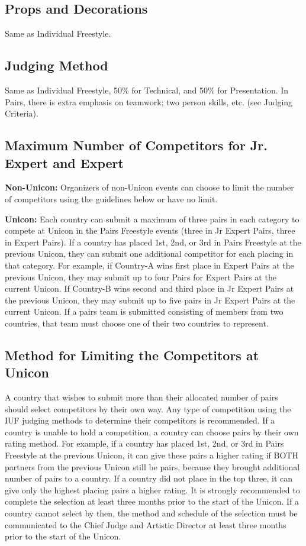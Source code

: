 \subsection{Props and Decorations}
Same as Individual Freestyle.

\subsection{Judging Method}
Same as Individual Freestyle, 50\% for Technical, and 50\% for Presentation.
In Pairs, there is extra emphasis on teamwork; two person skills, etc.
(see Judging Criteria).

\subsection{Maximum Number of Competitors for Jr. Expert and Expert}
\textbf{Non-Unicon:} Organizers of non-Unicon events can choose to limit the number of competitors using the guidelines below or have no limit.

\textbf{Unicon:} Each country can submit a maximum of three pairs in each category to compete at Unicon in the Pairs Freestyle events (three in Jr Expert Pairs, three in Expert Pairs).
If a country has placed 1st, 2nd, or 3rd in Pairs Freestyle at the previous Unicon, they can submit one additional competitor for each placing in that category.
For example, if Country-A wins first place in Expert Pairs at the previous Unicon, they may submit up to four Pairs for Expert Pairs at the current Unicon.
If Country-B wins second and third place in Jr Expert Pairs at the previous Unicon, they may submit up to five pairs in Jr Expert Pairs at the current Unicon.
If a pairs team is submitted consisting of members from two countries, that team must choose one of their two countries to represent.

\subsection{Method for Limiting the Competitors at Unicon}
A country that wishes to submit more than their allocated number of pairs should select competitors by their own way.
Any type of competition using the IUF judging methods to determine their competitors is recommended.
If a country is unable to hold a competition, a country can choose pairs by their own rating method.
For example, if a country has placed 1st, 2nd, or 3rd in Pairs Freestyle at the previous Unicon, it can give these pairs a higher rating if BOTH partners from the previous Unicon still be pairs, because they brought additional number of pairs to a country.
If a country did not place in the top three, it can give only the highest placing pairs a higher rating.
It is strongly recommended to complete the selection at least three months prior to the start of the Unicon.
If a country cannot select by then, the method and schedule of the selection must be communicated to the Chief Judge and Artistic Director at least three months prior to the start of the Unicon.

